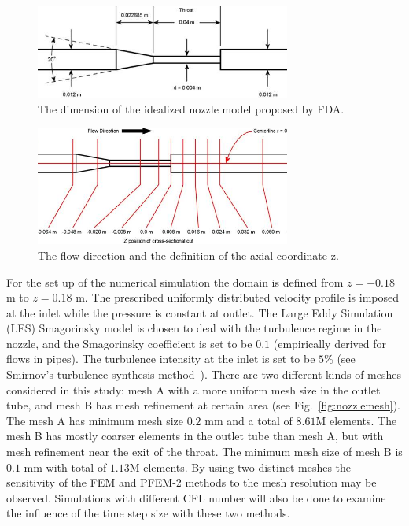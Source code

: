 \begin{figure}[htbp]
    \centering
    \includegraphics[width=3.3in]{imgs/nozzle_pump/nozzle_geo_2.png}
    \caption{The dimension of the idealized nozzle model proposed by FDA.}
    \label{fig:nozzlegeo1}
\end{figure}
\begin{figure}[htbp]
    \centering
    \includegraphics[width=3.3in]{imgs/nozzle_pump/nozzle_CS_2.png}
    \caption{The flow direction and the definition of the axial coordinate z.}
    \label{fig:nozzlegeo2}
\end{figure}


For the set up of the numerical simulation the domain is defined from $z=-0.18$ m to $z=0.18$ m. The prescribed uniformly distributed velocity profile is imposed at the inlet while the pressure is constant at outlet. The Large Eddy Simulation (LES) Smagorinsky model is chosen to deal with the turbulence regime in the nozzle, and the Smagorinsky coefficient is set to be $0.1$ (empirically derived for flows in pipes). The turbulence intensity at the inlet is set to be $5$\% (see Smirnov's turbulence synthesis method~\cite{Smirnov2001}). There are two different kinds of meshes considered in this study: mesh A with a more uniform mesh size in the outlet tube, and mesh B has mesh refinement at certain area (see Fig.~\ref{fig:nozzlemesh}). The mesh A has minimum mesh size $0.2$ mm and a total of $8.61$M elements. The mesh B has mostly coarser elements in the outlet tube than mesh A, but with mesh refinement near the exit of the throat. The minimum mesh size of mesh B is $0.1$ mm with total of $1.13$M elements. By using two distinct meshes the sensitivity of the FEM and PFEM-2 methods to the mesh resolution may be observed. Simulations with different CFL number will also be done to examine the influence of the time step size with these two methods.

